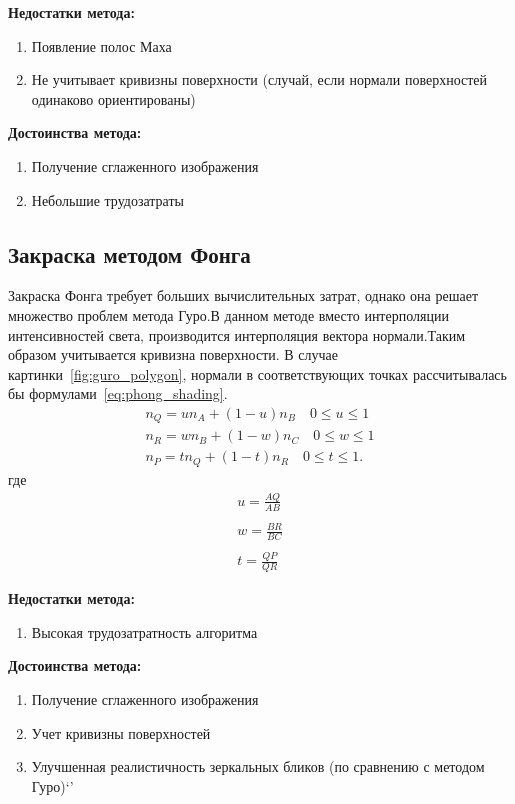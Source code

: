 \textbf{Недостатки метода:}
\begin{enumerate}
	\item Появление полос Маха 
	\item Не учитывает кривизны поверхности (случай, если нормали поверхностей одинаково ориентированы)
\end{enumerate}

\textbf{Достоинства метода:}
\begin{enumerate}
	\item Получение сглаженного изображения
	\item Небольшие трудозатраты
\end{enumerate}


\subsection{Закраска методом Фонга}
Закраска Фонга требует больших вычислительных затрат, однако она решает множество проблем метода Гуро.В данном методе вместо интерполяции интенсивностей света,
производится интерполяция вектора нормали.Таким образом учитывается кривизна поверхности.
В случае картинки~\ref{fig:guro_polygon}, нормали в соответствующих точках рассчитывалась бы формулами~\ref{eq:phong_shading}. \cite{Rodgers}
\begin{equation}
	\label{eq:phong_shading}
	\begin{aligned}
	n_Q = un_A + (1-u)n_B  \quad 0 \leq u \leq 1 \\
	n_R = wn_B + (1-w)n_C  \quad 0 \leq w \leq 1 \\
	n_P = tn_Q + (1-t)n_R  \quad 0 \leq t \leq 1.
	\end{aligned}
\end{equation}
где
\begin{equation}
	\begin{aligned}
	u = \frac{AQ}{AB} \\\\
	w = \frac{BR}{BC} \\\\
	t = \frac{QP}{QR} 
	\end{aligned}
\end{equation}

\textbf{Недостатки метода:}
\begin{enumerate} 
	\item Высокая трудозатратность алгоритма
\end{enumerate}

\textbf{Достоинства метода:}
\begin{enumerate}
	\item Получение сглаженного изображения
	\item Учет кривизны поверхностей
	\item Улучшенная реалистичность зеркальных бликов (по сравнению с методом Гуро)`'
\end{enumerate}


